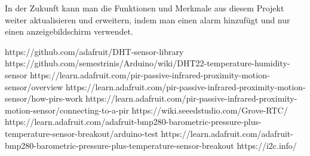 \documentclass[conference]{IEEEtran}
\begin{document}
In der Zukunft kann man die Funktionen und Merkmale aus diesem Projekt weiter aktualisieren und erweitern, indem man einen alarm hinzufügt und nur einen anzeigebildschirm verwendet.

\begin{thebibliography}{00}
 https://github.com/adafruit/DHT-sensor-library
 https://github.com/semestrinis/Arduino/wiki/DHT22-temperature-humidity-sensor
 https://learn.adafruit.com/pir-passive-infrared-proximity-motion-sensor/overview
 https://learn.adafruit.com/pir-passive-infrared-proximity-motion-sensor/how-pirs-work
 https://learn.adafruit.com/pir-passive-infrared-proximity-motion-sensor/connecting-to-a-pir
 https://wiki.seeedstudio.com/Grove-RTC/
 https://learn.adafruit.com/adafruit-bmp280-barometric-pressure-plus-temperature-sensor-breakout/arduino-test 
 https://learn.adafruit.com/adafruit-bmp280-barometric-pressure-plus-temperature-sensor-breakout
 https://i2c.info/
\end{thebibliography}
\vspace{12pt}
\end{document}
